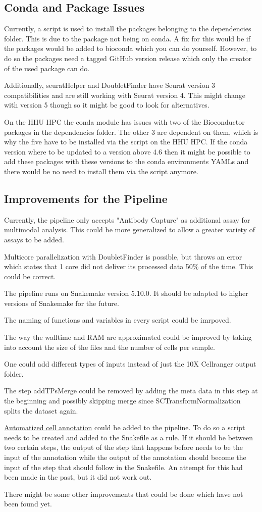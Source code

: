 \subsection{Conda and Package Issues}
Currently, a script is used to install the packages belonging to the dependencies folder. This is due to the package not being on conda. A fix for this would be if the packages would be added to bioconda which you can do yourself. However, to do so the packages need a tagged GitHub version release which only the creator of the used package can do.

Additionally, seuratHelper and DoubletFinder have Seurat version 3 compatibilities and are still working with Seurat version 4. This might change with version 5 though so it might be good to look for alternatives.

On the HHU HPC the conda module has issues with two of the Bioconductor packages in the dependencies folder. The other 3 are dependent on them, which is why the five have to be installed via the script on the HHU HPC. If the conda version where to be updated to a version above 4.6 then it might be possible to add these packages with these versions to the conda environments YAMLs and there would be no need to install them via the script anymore.

\subsection{Improvements for the Pipeline}
Currently, the pipeline only accepts "Antibody Capture" as additional assay for multimodal analysis. This could be more generalized to allow a greater variety of assays to be added.

Multicore parallelization with DoubletFinder is possible, but throws an error which states that 1 core did not deliver its processed data 50\% of the time. This could be correct.

The pipeline runs on Snakemake version 5.10.0. It should be adapted to higher versions of Snakemake for the future.

The naming of functions and variables in every script could be imrpoved.

The way the walltime and RAM are approximated could be improved by taking into account the size of the files and the number of cells per sample.

One could add different types of inputs instead of just the 10X Cellranger output folder.

The step addTPsMerge could be removed by adding the meta data in this step at the beginning and possibly skipping merge since SCTransformNormalization splits the dataset again.

\underline{Automatized cell annotation} could be added to the pipeline. To do so a script needs to be created and added to the Snakefile as a rule. If it should be between two certain steps, the output of the step that happens before needs to be the input of the annotation while the output of the annotation should become the input of the step that should follow in the Snakefile. An attempt for this had been made in the past, but it did not work out.

There might be some other improvements that could be done which have not been found yet.